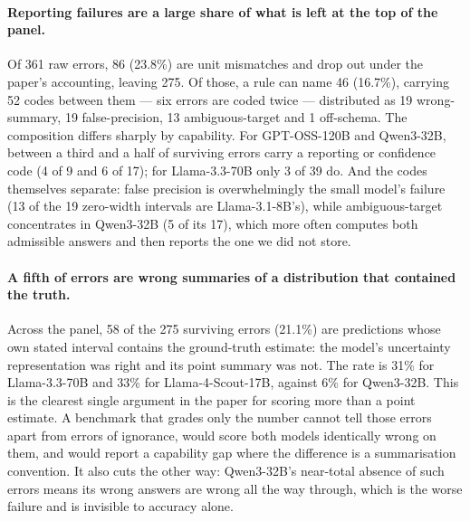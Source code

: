 \documentclass{article}
\begin{document}
\paragraph{Reporting failures are a large share of what is left at the top of the panel.} Of 361 raw errors, 86 (23.8\%) are unit mismatches and drop out under the paper's accounting, leaving 275. Of those, a rule can name 46 (16.7\%), carrying 52 codes between them --- six errors are coded twice --- distributed as 19 wrong-summary, 19 false-precision, 13 ambiguous-target and 1 off-schema. The composition differs sharply by capability. For GPT-OSS-120B and Qwen3-32B, between a third and a half of surviving errors carry a reporting or confidence code (4 of 9 and 6 of 17); for Llama-3.3-70B only 3 of 39 do. And the codes themselves separate: false precision is overwhelmingly the small model's failure (13 of the 19 zero-width intervals are Llama-3.1-8B's), while ambiguous-target concentrates in Qwen3-32B (5 of its 17), which more often computes both admissible answers and then reports the one we did not store.

\paragraph{A fifth of errors are wrong summaries of a distribution that contained the truth.} Across the panel, 58 of the 275 surviving errors (21.1\%) are predictions whose own stated interval contains the ground-truth estimate: the model's uncertainty representation was right and its point summary was not. The rate is 31\% for Llama-3.3-70B and 33\% for Llama-4-Scout-17B, against 6\% for Qwen3-32B. This is the clearest single argument in the paper for scoring more than a point estimate. A benchmark that grades only the number cannot tell those errors apart from errors of ignorance, would score both models identically wrong on them, and would report a capability gap where the difference is a summarisation convention. It also cuts the other way: Qwen3-32B's near-total absence of such errors means its wrong answers are wrong all the way through, which is the worse failure and is invisible to accuracy alone.
\end{document}
